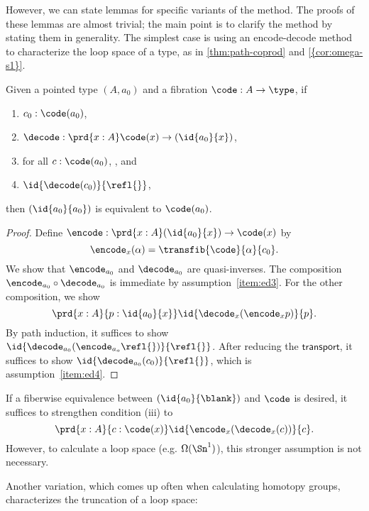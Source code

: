 {However, we can state lemmas for specific variants of the method.
The proofs of these lemmas are almost trivial; the main point is to
clarify the method by stating them in generality.  The simplest
case is using an encode-decode method to characterize the loop space of a
type, as in \cref{thm:path-coprod} and \cref{{cor:omega-s1}}.

\begin{lem}\label{lem:encode-decode-loop}
Given a pointed type $(A,a_0)$ and a fibration
$\code : A \to \type$, if
\begin{enumerate}
\item $c_0 : \code(a_0)$,\label{item:ed1}
\item $\decode : \prd{x:A} \code(x) \to (\id{a_0}{x})$,\label{item:ed2}
\item for all $c : \code(a_0)$, , and\label{item:ed3}
\item $\id{\decode(c_0)}{\refl{}}$,\label{item:ed4}
\end{enumerate}
then $(\id{a_0}{a_0})$ is equivalent to $\code(a_0)$.
\end{lem}

\begin{proof}
Define
$\encode : \prd{x:A} (\id{a_0}{x}) \to \code(x)$ by
\[
\encode_x(\alpha) = \transfib{\code}{\alpha}{c_0}.
\]
We show that $\encode_{a_0}$ and $\decode_{a_0}$ are quasi-inverses.
The composition $\encode_{a_0} \circ \decode_{a_0}$ is immediate by
assumption~\ref{item:ed3}.  For the other composition, we show
\[
\prd{x:A}{p : \id{a_0}{x}} \id{\decode_{x} (\encode_{x} p)}{p}.
\]
By path induction, it suffices to show
$\id{{\decode_{{a_0}} (\encode_{{a_o}} \refl{})}}{\refl{}}$.
After reducing the $\mathsf{transport}$, it suffices to show
$\id{{\decode_{{a_0}} (c_0)}}{\refl{}}$, which is assumption~\ref{item:ed4}.
\end{proof}

If a fiberwise equivalence between $(\id{a_0}{\blank})$ and $\code$ is desired,
it suffices to strengthen condition (iii) to
\[
\prd{x:A}{c : \code(x)} \id{\encode_{x}(\decode_{x}(c))}{c}.
\]
However, to calculate a loop space (e.g. $\Omega(\Sn ^1)$), this
stronger assumption is not necessary.

Another variation, which comes up often when calculating homotopy
groups, characterizes the truncation of a loop space:

}
